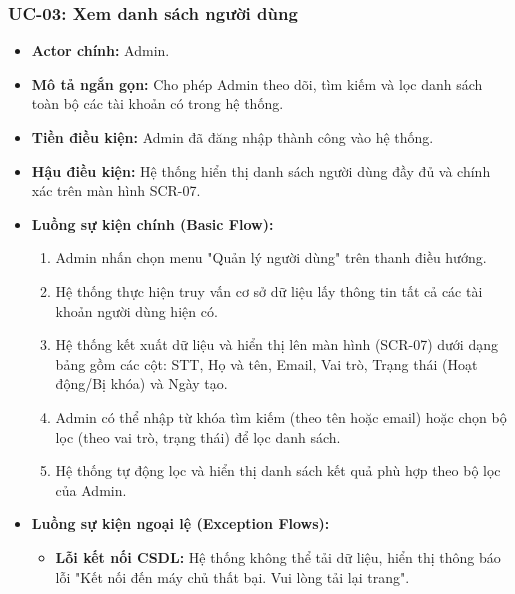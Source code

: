 \subsubsection{UC-03: Xem danh sách người dùng}
\label{subsubsec:uc03_view_users}
\begin{itemize}
    \item \textbf{Actor chính:} Admin.
    \item \textbf{Mô tả ngắn gọn:} Cho phép Admin theo dõi, tìm kiếm và lọc danh sách toàn bộ các tài khoản có trong hệ thống.
    \item \textbf{Tiền điều kiện:} Admin đã đăng nhập thành công vào hệ thống.
    \item \textbf{Hậu điều kiện:} Hệ thống hiển thị danh sách người dùng đầy đủ và chính xác trên màn hình SCR-07.
    \item \textbf{Luồng sự kiện chính (Basic Flow):}
        \begin{enumerate}
            \item Admin nhấn chọn menu "Quản lý người dùng" trên thanh điều hướng.
            \item Hệ thống thực hiện truy vấn cơ sở dữ liệu lấy thông tin tất cả các tài khoản người dùng hiện có.
            \item Hệ thống kết xuất dữ liệu và hiển thị lên màn hình (SCR-07) dưới dạng bảng gồm các cột: STT, Họ và tên, Email, Vai trò, Trạng thái (Hoạt động/Bị khóa) và Ngày tạo.
            \item Admin có thể nhập từ khóa tìm kiếm (theo tên hoặc email) hoặc chọn bộ lọc (theo vai trò, trạng thái) để lọc danh sách.
            \item Hệ thống tự động lọc và hiển thị danh sách kết quả phù hợp theo bộ lọc của Admin.
        \end{enumerate}
    \item \textbf{Luồng sự kiện ngoại lệ (Exception Flows):}
        \begin{itemize}
            \item \textbf{Lỗi kết nối CSDL:} Hệ thống không thể tải dữ liệu, hiển thị thông báo lỗi "Kết nối đến máy chủ thất bại. Vui lòng tải lại trang".
        \end{itemize}
\end{itemize}

